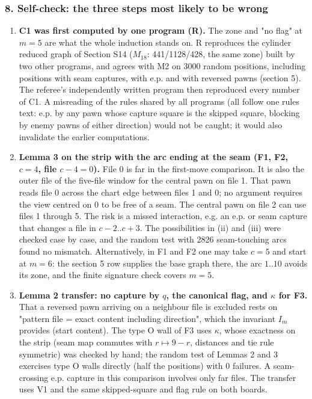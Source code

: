 \subsubsection*{8. Self-check: the three steps most likely to be wrong}
\begin{enumerate}
\item \textbf{C1 was first computed by one program (R).} The zone and "no flag" at $m=5$ are what the whole induction stands on. R reproduces the cylinder reduced graph of Section S14 ($M_{18}$: 441/1128/428, the same zone) built by two other programs, and agrees with M2 on 3000 random positions, including positions with seam captures, with e.p. and with reversed pawns (section 5). The referee's independently written program then reproduced every number of C1. A misreading of the rules shared by all programs (all follow one rules text: e.p. by any pawn whose capture square is the skipped square, blocking by enemy pawns of either direction) would not be caught; it would also invalidate the earlier computations.
\item \textbf{Lemma 3 on the strip with the arc ending at the seam (F1, F2, $c=4$, file $c-4=0$).} File 0 is far in the first-move comparison. It is also the outer file of the five-file window for the central pawn on file 1. That pawn reads file 0 across the chart edge between files 1 and 0; no argument requires the view centred on 0 to be free of a seam. The central pawn on file 2 can use files 1 through 5. The risk is a missed interaction, e.g. an e.p. or seam capture that changes a file in $c-2..c+3$. The possibilities in (ii) and (iii) were checked case by case, and the random test with 2826 seam-touching arcs found no mismatch. Alternatively, in F1 and F2 one may take $c=5$ and start at $m=6$: the section 5 row supplies the base graph there, the arc $1..10$ avoids its zone, and the finite signature check covers $m=5$.
\item \textbf{Lemma 2 transfer: no capture by $q$, the canonical flag, and $\kappa$ for F3.} That a reversed pawn arriving on a neighbour file is excluded rests on "pattern file = exact content including direction", which the invariant $I_m$ provides (start content). The type O wall of F3 uses $\kappa$, whose exactness on the strip (seam map commutes with $r\mapsto9-r$, distances and tie rule symmetric) was checked by hand; the random test of Lemmas 2 and 3 exercises type O walls directly (half the positions) with 0 failures. A seam-crossing e.p. capture in this comparison involves only far files. The transfer uses V1 and the same skipped-square and flag rule on both boards.
\end{enumerate}

